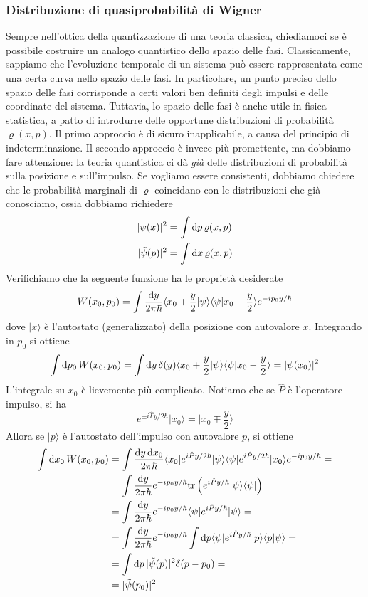 \documentclass[a4paper, 11pt]{article}
\newcommand{\tr}{\mathrm{tr}}
\newcommand{\Imp}{\hat{P}}
\renewcommand{\ket}[1]{| #1\rangle}
\renewcommand{\bra}[1]{\langle #1|}
\begin{document}
\subsubsection{Distribuzione di quasiprobabilità di Wigner}
Sempre nell'ottica della quantizzazione di una teoria classica, chiediamoci se è possibile costruire un analogo quantistico dello spazio delle fasi. Classicamente, sappiamo che l'evoluzione temporale di un sistema può essere rappresentata come una certa curva nello spazio delle fasi. In particolare, un punto preciso dello spazio delle fasi corrisponde a certi valori ben definiti degli impulsi e delle coordinate del sistema. Tuttavia, lo spazio delle fasi è anche utile in fisica statistica, a patto di introdurre delle opportune distribuzioni di probabilità $\varrho(x,p)$. Il primo approccio è di sicuro inapplicabile, a causa del principio di indeterminazione. Il secondo approccio è invece più promettente, ma dobbiamo fare attenzione: la teoria quantistica ci dà \emph{già} delle distribuzioni di probabilità sulla posizione e sull'impulso. Se vogliamo essere consistenti, dobbiamo chiedere che le probabilità marginali di $\varrho$ coincidano con le distribuzioni che già conosciamo, ossia dobbiamo richiedere
\begin{align*}
	|\psi(x)|^2&=\int\mathrm{d} p\,\varrho(x,p)\\
	|\tilde{\psi}(p)|^2&=\int \mathrm{d} x\,\varrho(x,p)
\end{align*}
Verifichiamo che la seguente funzione ha le proprietà desiderate
\[W(x_0,p_0)=\int\frac{\mathrm{d} y}{2\pi\hbar}\langle x_0+\frac{y}{2}\vert\psi\rangle\langle \psi\vert x_0-\frac{y}{2}\rangle e^{-ip_0y/\hbar}\]
dove $\ket{x}$ è l'autostato (generalizzato) della posizione con autovalore $x$. Integrando in $p_0$ si ottiene
\[\int\mathrm{d} p_0\,W(x_0,p_0)=\int\mathrm{d} y\,\delta(y)\langle x_0+\frac{y}{2}\vert\psi\rangle\langle \psi\vert x_0-\frac{y}{2}\rangle=|\psi(x_0)|^2\]
L'integrale su $x_0$ è lievemente più complicato. Notiamo che se $\Imp$ è l'operatore impulso, si ha
\[e^{\pm i\Imp y/2\hbar}\ket{x_0}=|x_0\mp\frac{y}{2}\rangle\]
Allora se $\ket p$ è l'autostato dell'impulso con autovalore $p$, si ottiene
\begin{align*}
	\int \d x_0\,W(x_0,p_0)&=\int\frac{\d y\,\d x_0}{2\pi\hbar}\bra{x_0}e^{i\hat{P}y/2\hbar}\ket\psi\braketop{\psi}{e^{i\hat{P}y/2\hbar}}{x_0}e^{-ip_0y/\hbar}=\\&=\int\frac{\d y}{2\pi\hbar}e^{-ip_0y/\hbar}\tr\left(e^{i\hat{P}y/\hbar}\ket\psi\bra\psi\right)=\\&=\int\frac{\d y}{2\pi\hbar}e^{-ip_0y/\hbar}\braketop{\psi}{e^{i\hat{P}y/\hbar}}{\psi}=\\&=\int\frac{\d y}{2\pi\hbar}e^{-ip_0y/\hbar}\int \d p\bra \psi e^{i\Imp y/\hbar}\ket{p}\braket{p}{\psi}=\\&=\int \d p\,|\tilde{\psi}(p)|^2\delta(p-p_0)=\\&=|\tilde{\psi}(p_0)|^2
\end{align*}
\end{document}
